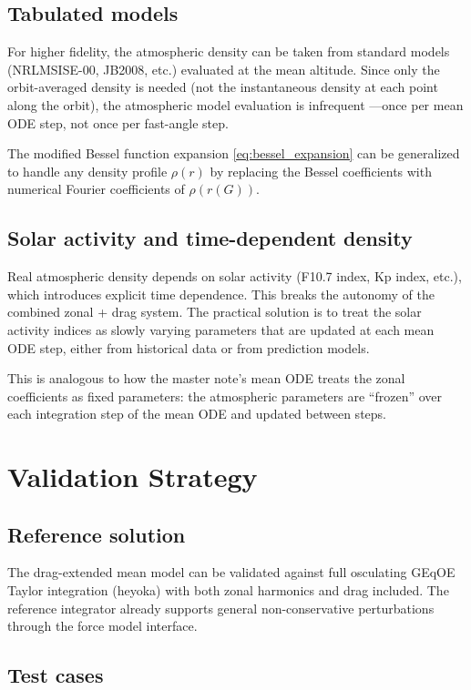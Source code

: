 \documentclass[11pt]{article}
\begin{document}
\subsection{Tabulated models}

For higher fidelity, the atmospheric density can be taken from standard
models (NRLMSISE-00, JB2008, etc.) evaluated at the mean altitude. Since
only the orbit-averaged density is needed (not the instantaneous density at
each point along the orbit), the atmospheric model evaluation is infrequent
---once per mean ODE step, not once per fast-angle step.

The modified Bessel function expansion \eqref{eq:bessel_expansion} can be
generalized to handle any density profile $\rho(r)$ by replacing the
Bessel coefficients with numerical Fourier coefficients of $\rho(r(G))$.

\subsection{Solar activity and time-dependent density}

Real atmospheric density depends on solar activity (F10.7 index, Kp index,
etc.), which introduces explicit time dependence. This breaks the autonomy
of the combined zonal + drag system. The practical solution is to treat the
solar activity indices as slowly varying parameters that are updated at each
mean ODE step, either from historical data or from prediction models.

This is analogous to how the master note's mean ODE treats the zonal
coefficients as fixed parameters: the atmospheric parameters are ``frozen''
over each integration step of the mean ODE and updated between steps.


\section{Validation Strategy}

\subsection{Reference solution}

The drag-extended mean model can be validated against full osculating
GEqOE Taylor integration (heyoka) with both zonal harmonics and drag
included. The reference integrator already supports general non-conservative
perturbations through the force model interface.

\subsection{Test cases}
\end{document}
